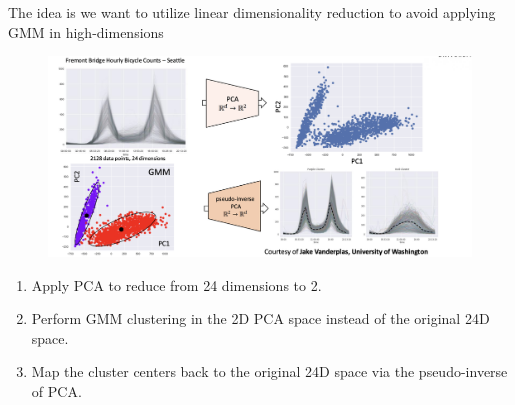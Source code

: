 \documentclass[11pt]{article}
\begin{document}
\medskip

The idea is we want to utilize linear dimensionality reduction to avoid applying GMM in high-dimensions

\begin{figure}[h]
	\centering
	\includegraphics[width=1\textwidth]{../imgs/high-low-dim.png} %
\end{figure}

\begin{enumerate}
	\item Apply PCA to reduce from 24 dimensions to 2.

	\item Perform GMM clustering in the 2D PCA space instead of the original 24D space. 

	\item Map the cluster centers back to the original 24D space via the pseudo-inverse of PCA. 
\end{enumerate}
\end{document}
